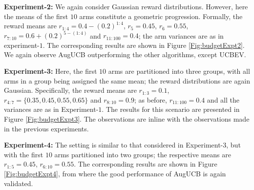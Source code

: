	
\textbf{Experiment-2:} We again consider  Gaussian reward distributions. However, here the means of the first $10$ arms constitute a geometric progression.
Formally, the reward means are $r_{1:4}=0.4-(0.2)^{1:4}$, $r_{5}=0.45$, $r_{6}=0.55$, $r_{7:10}=0.6+(0.2)^{5-(1:4)}$ and $r_{11:100}=0.4$; the arm variances are as in experiment-$1$. The corresponding results are shown in Figure \ref{Fig:budgetExpt2}.  We again observe AugUCB outperforming the other algorithms, except UCBEV. 
	
\textbf{Experiment-3:} Here, the first
$10$ arms are partitioned into three groups, with all arms in a group being assigned the same mean; the reward distributions are again Gaussian. Specifically, the reward means are $r_{1:3}=0.1$, $r_{4:7}=\lbrace 0.35, 0.45, 0.55, 0.65\rbrace$ and $r_{8:10}=0.9$; as before,  $r_{11:100}=0.4$ and all the variances are as in Experiment-$1$. The results for this scenario are presented in Figure \ref{Fig:budgetExpt3}. The observations are inline with the observations made in the previous experiments.

	
	
\textbf{Experiment-4:} The setting is similar to that considered in Experiment-3, but with the first $10$ arms partitioned into two groups; the respective means are $r_{1:5}=0.45$, $r_{6:10}=0.55$.
The corresponding results are shown in Figure \ref{Fig:budgetExpt4}, from where the good performance of AugUCB is again validated.

	
	
